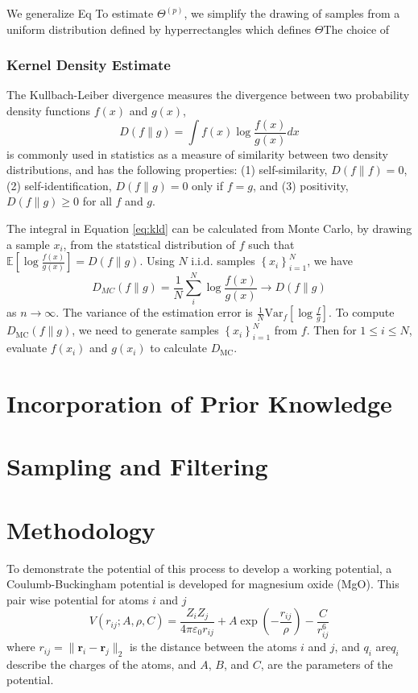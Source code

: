 We generalize Eq
To estimate $\Theta^{(p)}$, we simplify the drawing of samples from a uniform distribution defined by hyperrectangles which defines $\Theta$The choice of
\subsubsection{Kernel Density Estimate}

The Kullbach-Leiber divergence\cite{kullback1951_kld} measures the divergence between two probability density functions $f(x)$ and $g(x)$,
\begin{equation}\label{eq:kld}
   D(f \parallel g) = \int f(x) \log \frac{f(x)}
                                          {g(x)} dx
\end{equation}
is commonly used in statistics as a measure of similarity between two density distributions, and has the following properties: (1) self-similarity, $D(f \parallel f) = 0$, (2) self-identification, $D(f \parallel g) = 0$ only if $f=g$, and (3) positivity, $D(f \parallel g) \geq 0$ for all $f$ and $g$.

The integral in Equation \ref{eq:kld} can be calculated from Monte Carlo\cite{hershey2007_kld_approx}, by drawing a sample $x_i$, from the statstical distribution of $f$ such that $\mathbb{E}\left[\log\frac{f(x)}{g(x)}\right] = D(f \parallel g)$.  Using $N$ i.i.d. samples $\left\{x_i\right\}_{i=1}^N$, we have
\begin{equation}
  \label{eq:kdmc}
  D_{MC}(f \parallel g) = \frac{1}{N}\sum_i^N \log \frac{f(x)}{g(x)}
      \rightarrow D(f \parallel g)
\end{equation}
as $n \rightarrow \infty$.  The variance of the estimation error is $\frac{1}{N}\mathrm{Var}_f\left[\log\frac{f}{g}\right]$.  To compute $D_{\mathrm{MC}}(f \parallel g)$, we need to generate samples $\left\{x_i\right\}_{i=1}^N$ from $f$.  Then for $1 \leq i \leq N$, evaluate $f(x_i)$ and $g(x_i)$ to calculate $D_{\mathrm{MC}}$.
\section{Incorporation of Prior Knowledge}

\section{Sampling and Filtering}
\section{Methodology}
To demonstrate the potential of this process to develop a working potential, a Coulumb-Buckingham potential\cite{lewis1985_pot_buck_oxides} is developed for magnesium oxide (MgO).
This pair wise potential for atoms $i$ and $j$
\begin{equation}
    \label{eq:buck_eq}
    V(r_{ij};A,\rho,C)
        = \frac{Z_i Z_j}{4 \pi \varepsilon_0 r_{ij}}
            + A \exp(-\frac{r_{ij}}{\rho})
            - \frac{C}{r_{ij}^6}
\end{equation}
where $r_{ij} = \lVert \bm{r}_i - \bm{r}_j \rVert_2$ is the distance between the atoms $i$ and $j$, and $q_i$ are$q_i$ describe the charges of the atoms, and $A$, $B$, and $C$, are the parameters of the potential.

